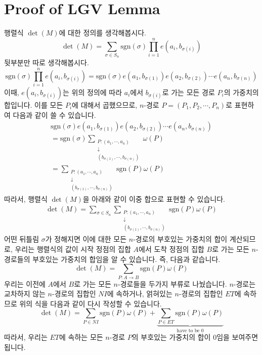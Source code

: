 \documentclass[a4paper]{article}
\begin{document}
\section{Proof of LGV Lemma}
행렬식 $\det(M)$에 대한 정의를 생각해봅시다. $$\det(M) = \sum_{\sigma \in S_n} \mathrm{sgn}(\sigma)\prod_{i=1}^{n}e(a_i, b_{\sigma(i)})$$ 뒷부분만 따로 생각해봅시다. $$\mathrm{sgn}(\sigma)\prod_{i=1}^{n}e(a_i, b_{\sigma(i)}) = \mathrm{sgn}(\sigma)e(a_1, b_{\sigma(1)})e(a_2, b_{\sigma(2)})\cdots e(a_n, b_{\sigma(n)})$$ 이때, $e(a_i, b_{\sigma(i)})$는 위의 정의에 따라 $a_i$에서 $b_{\sigma(i)}$로 가는 모든 경로 $P_i$의 가중치의 합입니다. 이를 모든 $P_i$에 대해서 곱했으므로, $n$-경로 $P = (P_1, P_2, \cdots, P_n)$로 표현하여 다음과 같이 쓸 수 있습니다.
\begin{eqnarray*} \mathrm{sgn}(\sigma)e(a_1, b_{\sigma(1)})e(a_2, b_{\sigma(2)})\cdots e(a_n, b_{\sigma(n)}) \\
= \mathrm{sgn}(\sigma)  \sum_{\substack{P : (a_1, \cdots, a_n)\\ \downarrow \\(b_{\sigma(1)}, \cdots, b_{\sigma(n)})}} \omega(P) \\
=  \sum_{\substack{P : (a_1, \cdots, a_n)\\ \downarrow \\(b_{\sigma(1)}, \cdots, b_{\sigma(n)})}} \mathrm{sgn}(P) \omega(P)
\end{eqnarray*}
따라서, 행렬식 $\det(M)$을 아래와 같이 이중 합으로 표현할 수 있습니다.
\begin{eqnarray*} \det(M) = \sum_{\sigma \in S_n} \sum_{\substack{P : (a_1, \cdots, a_n)\\ \downarrow \\(b_{\sigma(1)}, \cdots, b_{\sigma(n)})}} \mathrm{sgn}(P) \omega(P)
\end{eqnarray*}
어떤 뒤틀림 $\sigma$가 정해지면 이에 대한 모든 $n$-경로의 부호있는 가중치의 합이 계산되므로, 우리는 행렬식의 값이 시작 정점의 집합 $A$에서 도착 정점의 집합 $B$로 가는 모든 $n$-경로들의 부호있는 가중치의 합임을 알 수 있습니다. 즉, 다음과 같습니다. $$\det(M) = \sum_{P:A \rightarrow B} \mathrm{sgn}(P)\omega(P)$$
우리는 이전에 $A$에서 $B$로 가는 모든 $n$-경로들을 두가지 부류로 나눴습니다. $n$-경로는 교차하지 않는 $n$-경로의 집합인 $NI$에 속하거나, 얽혀있는 $n$-경로의 집합인 $ET$에 속하므로 위의 식을 다음과 같이 다시 작성할 수 있습니다. $$\det(M) = \sum_{P \in NI} \mathrm{sgn}(P)\omega(P) + \underbrace{\sum_{P \in ET} \mathrm{sgn}(P)\omega(P)}_{\textrm{have to be 0}}$$
따라서, 우리는 $ET$에 속하는 모든 $n$-경로 $P$의 부호있는 가중치의 합이 $0$임을 보여주면 됩니다.\\
\end{document}
